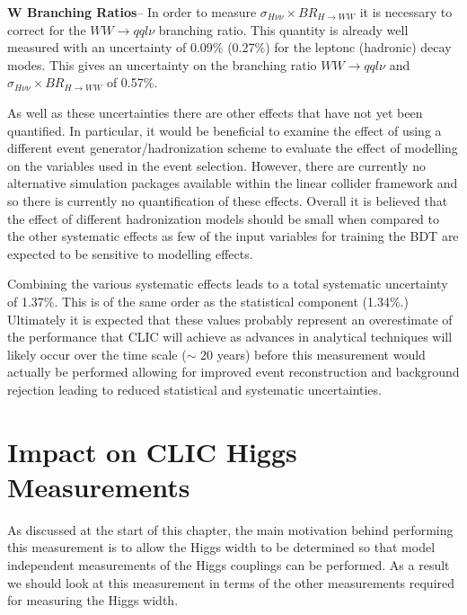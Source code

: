 \textbf{W Branching Ratios}-- In order to measure $\sigma_{H\nu\nu}\times BR_{H\rightarrow WW}$ it is necessary to correct for the $WW\rightarrow qql\nu$ branching ratio. This quantity is already well measured\cite{Patrignani:2016xqp} with an uncertainty of 0.09\% (0.27\%) for the leptonc (hadronic) decay modes. This gives an uncertainty on the branching ratio $WW\rightarrow qql\nu$ and $\sigma_{H\nu\nu}\times BR_{H\rightarrow WW}$ of 0.57\%.

As well as these uncertainties there are other effects that have not yet been quantified. In particular, it would be beneficial to examine the effect of using a different event generator/hadronization scheme to evaluate the effect of modelling on the variables used in the event selection. However, there are currently no alternative simulation packages available within the linear collider framework and so there is currently no quantification of these effects. Overall it is believed that the effect of different hadronization models should be small when compared to the other systematic effects as few of the input variables for training the BDT are expected to be sensitive to modelling effects.

Combining the various systematic effects leads to a total systematic uncertainty of 1.37\%. This is of the same order as the statistical component (1.34\%.) Ultimately it is expected that these values probably represent an overestimate of the performance that \ac{CLIC} will achieve as advances in analytical techniques will likely occur over the time scale ($\sim$ 20 years) before this measurement would actually be performed allowing for improved event reconstruction and background rejection leading to reduced statistical and systematic uncertainties.  

\section{Impact on CLIC Higgs Measurements}
As discussed at the start of this chapter, the main motivation behind performing this measurement is to allow the Higgs width to be determined so that model independent measurements of the Higgs couplings can be performed. As a result we should look at this measurement in terms of the other measurements required for measuring the Higgs width.

